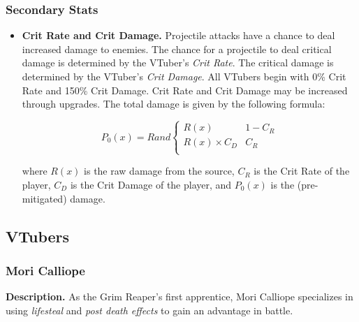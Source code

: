 \documentclass[10pt, a4paper]{article}
\begin{document}
  	\subsubsection{Secondary Stats}
  	
  	\begin{itemize}
  	 \item \textbf{Crit Rate and Crit Damage.} Projectile attacks have a chance to deal increased damage to enemies. The chance for a projectile to deal critical damage is determined by the VTuber's \textit{Crit Rate}. The critical damage is determined by the VTuber's \textit{Crit Damage}. All VTubers begin with 0\% Crit Rate and 150\% Crit Damage. Crit Rate and Crit Damage may be increased through upgrades. The total damage is given by the following formula:

  	 \[
	  	 P_0(x) = Rand\begin{cases}
	  	 	R(x) & 1 - C_R\\
	  	 	R(x) \times C_D & C_R \\
	  	 \end{cases}
  	 \]
  	 
  	 where $R(x)$ is the raw damage from the source, $C_R$ is the Crit Rate of the player, $C_D$ is the Crit Damage of the player, and $P_0(x)$ is the (pre-mitigated) damage.
  	 
  	\end{itemize}
	
	\pagebreak

  	\subsection{VTubers} \label{VTubers}
  	
  	\subsubsection{Mori Calliope}
  	
  	\textbf{Description.} As the Grim Reaper's first apprentice, Mori Calliope specializes in using \textit{lifesteal} and \textit{post death effects} to gain an advantage in battle.
  	
\end{document}
